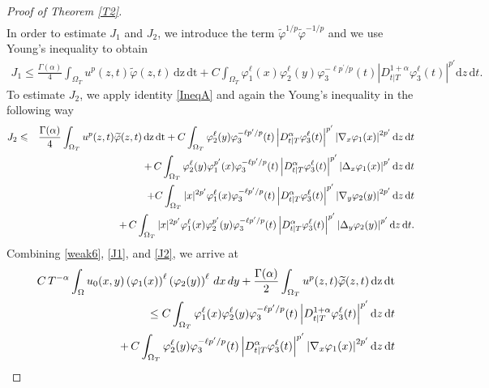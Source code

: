 \documentclass[10pt,a4paper]{amsart}
\begin{document}
\begin{proof}[Proof of Theorem \ref{T2}]
\begin{eqnarray}
	\end{eqnarray}
	\noindent In order to estimate $J_1$ and $J_2$, we introduce the term 
	$\widetilde{\varphi}^{1/p}\widetilde{\varphi}^{-1/p}$ and we use Young's inequality to obtain
	\begin{align}\label{J1}
		J_1\leqslant\frac{\Gamma(\alpha)}{4} \int_{\Omega_T}u^{p}(z,t)\widetilde{\varphi}(z,t)\,\mathrm{dz}\,\mathrm{dt}+C\int_{\Omega_T}\varphi_1^\ell(x)\varphi_2^\ell(y)\varphi_3^{-\ell p^\prime/p}(t)\left|D^{1+\alpha}_{t|T} \varphi^\ell_3(t)\right|^{p'}\mathrm{d}z\,\mathrm{d}t.
	\end{align}
	To estimate $J_2$, we apply identity \eqref{IneqA} and again the Young's inequality in the following way
	\begin{eqnarray}\label{J2}
		J_2&\leqslant&\frac{\Gamma(\alpha)}{4} \int_{\Omega_T}u^{p}(z,t)\widetilde{\varphi}(z,t)\,\mathrm{dz}\,\mathrm{dt}+C\int_{\Omega_T}\varphi_2^\ell(y)\varphi_3^{-\ell p^\prime/p}(t)\left|D^{\alpha}_{t|T} \varphi^\ell_3(t)\right|^{p'}\left|\nabla_x \varphi_1(x)\right|^{2p'}\mathrm{d}z\,\mathrm{d}t\notag\\
		&{}&+\,C\int_{\Omega_T}\varphi_2^\ell(y)\varphi_1^{p'}(x)\varphi_3^{-\ell p^\prime/p}(t)\left|D^{\alpha}_{t|T} \varphi^\ell_3(t)\right|^{p'}\left|\Delta_x \varphi_1(x)\right|^{p'}\mathrm{d}z\,\mathrm{d}t\nonumber\\
		&&+C\int_{\Omega_T}|x|^{2p'}\varphi_1^\ell(x)\varphi_3^{-\ell p^\prime/p}(t)\left|D^{\alpha}_{t|T} \varphi^\ell_3(t)\right|^{p'}\left|\nabla_y \varphi_2(y)\right|^{2p'}\mathrm{d}z\,\mathrm{d}t\notag\\
		&{}&+\,C\int_{\Omega_T}|x|^{2p'}\varphi_1^\ell(x)\varphi_2^{p'}(y)\varphi_3^{-\ell p^\prime/p}(t)\left|D^{\alpha}_{t|T} \varphi^\ell_3(t)\right|^{p'}\left|\Delta_y \varphi_2(y)\right|^{p'}\mathrm{d}z\,\mathrm{d}t.
	\end{eqnarray}
	Combining \eqref{weak6}, \eqref{J1}, and \eqref{J2}, we arrive at
	\begin{eqnarray}\label{weak7}
		&{}&C\,T^{-\alpha}\int_{\Omega}u_0(x,y)\left(\varphi_1(x)\right)^\ell \left(\varphi_2(y)\right)^\ell\,dx\,dy+\frac{\Gamma(\alpha)}{2}\int_{\Omega_T}u^{p}(z,t)\widetilde{\varphi}(z,t)\,\mathrm{dz}\,\mathrm{dt}\notag\\
		&{}&\leq C\int_{\Omega_T}\varphi_1^\ell(x)\varphi_2^\ell(y)\varphi_3^{-\ell p^\prime/p}(t)\left|D^{1+\alpha}_{t|T} \varphi^\ell_3(t)\right|^{p'}\mathrm{d}z\,\mathrm{d}t\notag\\&&\quad+\,C\int_{\Omega_T}\varphi_2^\ell(y)\varphi_3^{-\ell p^\prime/p}(t)\left|D^{\alpha}_{t|T} \varphi^\ell_3(t)\right|^{p'}\left|\nabla_x \varphi_1(x)\right|^{2p'}\mathrm{d}z\,\mathrm{d}t\notag\\

\end{eqnarray}
\end{proof}
\end{document}
